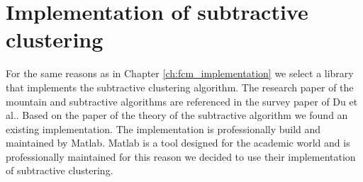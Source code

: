 \documentclass[../../main]{subfiles}
\begin{document}
\section{Implementation of subtractive clustering}
For the same reasons as in Chapter \ref{ch:fcm_implementation} we select a library that implements the subtractive clustering algorithm.
The research paper of the mountain and subtractive algorithms are referenced in the survey paper of Du et al.\cite{Du2010Clustering:Approach}.
Based on the paper of the theory of the subtractive algorithm\cite{Chiu1994FuzzyEstimation} we found an existing implementation\cite{matlabSubtractive}.
The implementation is professionally build and maintained by Matlab\cite{matlabSubtractive}.
Matlab is a tool designed for the academic world and is professionally maintained for this reason we decided to use their implementation of subtractive clustering\cite{matlab}.
\end{document}
